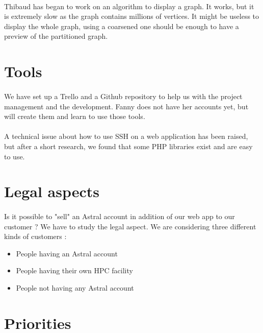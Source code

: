 \documentclass{cranfieldChart}
\begin{document}
\paragraph{}
Thibaud has began to work on an algorithm to display a graph. It works, but it is extremely slow as the graph contains millions of vertices. It might be useless to display the whole graph, using a coarsened one should be enough to have a preview of the partitioned graph.

\section*{Tools}

\paragraph{}
We have set up a Trello and a Github repository to help us with the project management and the development. Fanny does not have her accounts yet, but will create them and learn to use those tools.

\paragraph{}
A technical issue about how to use SSH on a web application has been raised, but after a short research, we found that some PHP libraries exist and are easy to use.

\section*{Legal aspects}

\paragraph{}
Is it possible to "sell" an Astral account in addition of our web app to our customer ? We have to study the legal aspect. We are considering three different kinds of customers :
\begin{itemize}
	\item People having an Astral account
	\item People having their own HPC facility
	\item People not having any Astral account
\end{itemize}

\section*{Priorities}
\end{document}

